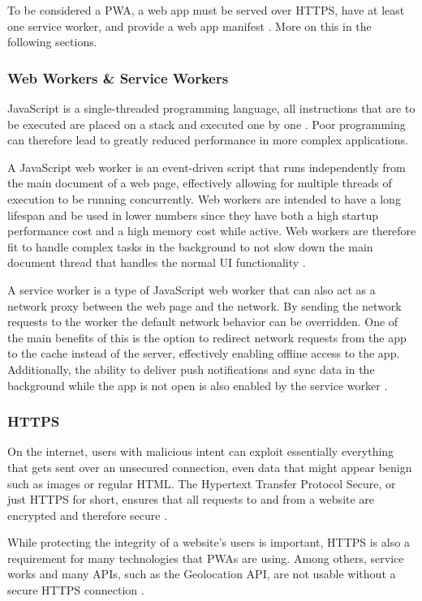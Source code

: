 \documentclass[a4paper,12pt]{article}
\begin{document}
To be considered a PWA, a web app must be served over HTTPS, have at least one service worker, and provide a web app manifest \cite{serviceworker_efficiency}. More on this in the following sections.

\subsubsection{Web Workers \& Service Workers}
\label{Theory_PWA_serviceWorkers}
JavaScript is a single-threaded programming language, all instructions that are to be executed are placed on a stack and executed one by one \cite{mozilla_js}. Poor programming can therefore lead to greatly reduced performance in more complex applications.

A JavaScript web worker is an event-driven script that runs independently from the main document of a web page, effectively allowing for multiple threads of execution to be running concurrently. Web workers are intended to have a long lifespan and be used in lower numbers since they have both a high startup performance cost and a high memory cost while active. Web workers are therefore fit to handle complex tasks in the background to not slow down the main document thread that handles the normal UI functionality \cite{workers_html_spec}.

A service worker is a type of JavaScript web worker that can also act as a network proxy between the web page and the network. By sending the network requests to the worker the default network behavior can be overridden. One of the main benefits of this is the option to redirect network requests from the app to the cache instead of the server, effectively enabling offline access to the app. Additionally, the ability to deliver push notifications and sync data in the background while the app is not open is also enabled by the service worker \cite{service_workers_spec}.

\subsubsection{HTTPS}
\label{Theory_PWA_HTTPS}
On the internet, users with malicious intent can exploit essentially everything that gets sent over an unsecured connection, even data that might appear benign such as images or regular HTML. The Hypertext Transfer Protocol Secure, or just HTTPS for short, ensures that all requests to and from a website are encrypted and therefore secure \cite{why_https_matters}.

While protecting the integrity of a website’s users is important, HTTPS is also a requirement for many technologies that PWAs are using. Among others, service works and many APIs, such as the Geolocation API, are not usable without a secure HTTPS connection \cite{why_https_matters}.
\end{document}
